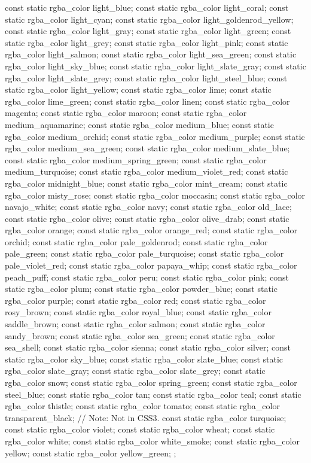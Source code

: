\begin{codeblock}
{{{{{    const static rgba_color light_blue;
    const static rgba_color light_coral;
    const static rgba_color light_cyan;
    const static rgba_color light_goldenrod_yellow;
    const static rgba_color light_gray;
    const static rgba_color light_green;
    const static rgba_color light_grey;
    const static rgba_color light_pink;
    const static rgba_color light_salmon;
    const static rgba_color light_sea_green;
    const static rgba_color light_sky_blue;
    const static rgba_color light_slate_gray;
    const static rgba_color light_slate_grey;
    const static rgba_color light_steel_blue;
    const static rgba_color light_yellow;
    const static rgba_color lime;
    const static rgba_color lime_green;
    const static rgba_color linen;
    const static rgba_color magenta;
    const static rgba_color maroon;
    const static rgba_color medium_aquamarine;
    const static rgba_color medium_blue;
    const static rgba_color medium_orchid;
    const static rgba_color medium_purple;
    const static rgba_color medium_sea_green;
    const static rgba_color medium_slate_blue;
    const static rgba_color medium_spring_green;
    const static rgba_color medium_turquoise;
    const static rgba_color medium_violet_red;
    const static rgba_color midnight_blue;
    const static rgba_color mint_cream;
    const static rgba_color misty_rose;
    const static rgba_color moccasin;
    const static rgba_color navajo_white;
    const static rgba_color navy;
    const static rgba_color old_lace;
    const static rgba_color olive;
    const static rgba_color olive_drab;
    const static rgba_color orange;
    const static rgba_color orange_red;
    const static rgba_color orchid;
    const static rgba_color pale_goldenrod;
    const static rgba_color pale_green;
    const static rgba_color pale_turquoise;
    const static rgba_color pale_violet_red;
    const static rgba_color papaya_whip;
    const static rgba_color peach_puff;
    const static rgba_color peru;
    const static rgba_color pink;
    const static rgba_color plum;
    const static rgba_color powder_blue;
    const static rgba_color purple;
    const static rgba_color red;
    const static rgba_color rosy_brown;
    const static rgba_color royal_blue;
    const static rgba_color saddle_brown;
    const static rgba_color salmon;
    const static rgba_color sandy_brown;
    const static rgba_color sea_green;
    const static rgba_color sea_shell;
    const static rgba_color sienna;
    const static rgba_color silver;
    const static rgba_color sky_blue;
    const static rgba_color slate_blue;
    const static rgba_color slate_gray;
    const static rgba_color slate_grey;
    const static rgba_color snow;
    const static rgba_color spring_green;
    const static rgba_color steel_blue;
    const static rgba_color tan;
    const static rgba_color teal;
    const static rgba_color thistle;
    const static rgba_color tomato;
    const static rgba_color transparent_black; // Note: Not in CSS3.
    const static rgba_color turquoise;
    const static rgba_color violet;
    const static rgba_color wheat;
    const static rgba_color white;
    const static rgba_color white_smoke;
    const static rgba_color yellow;
    const static rgba_color yellow_green;
  };

}}}}
\end{codeblock}
